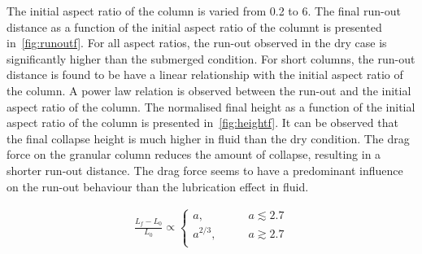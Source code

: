The initial aspect ratio of the column is varied from 0.2 to 6. The final 
run-out distance as a function of the initial aspect ratio of the columnt is 
presented in~\cref{fig:runoutf}. For all aspect ratios, the run-out observed in 
the dry case is significantly higher than the submerged condition. For short 
columns, the run-out distance is found to be have a linear relationship with 
the initial aspect ratio of the column.  A power law 
relation is observed between the run-out and the initial aspect ratio of the 
column. The normalised final height as a function of the initial aspect ratio 
of the column is presented in~\cref{fig:heightf}. It can be observed that the 
final collapse height is much higher in fluid than the dry condition. 
The drag force on the granular column reduces the amount of collapse, resulting 
in a shorter run-out distance. The drag force seems to have a predominant 
influence on the run-out behaviour than the lubrication effect in fluid. 

\begin{align}
\frac{L_{\textit{f}}-L_{\textit{0}}}{L_{\textit{0}}} \propto 
\begin{cases}
a, &\qquad \textit{a}\lesssim 2.7 \\
a^{2/3}, &\qquad \textit{a} \gtrsim 2.7 \\
\end{cases}
\end{align}


